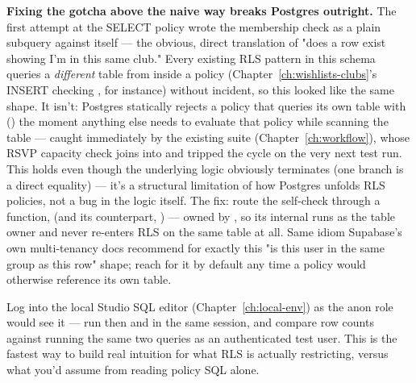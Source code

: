 \begin{olkgotcha}
\textbf{Fixing the gotcha above the naive way breaks Postgres outright.} The first attempt at the  SELECT policy wrote the membership check as a plain  subquery against  itself — the obvious, direct translation of "does a row exist showing I'm in this same club." Every existing RLS pattern in this schema queries a \emph{different} table from inside a policy (Chapter~\ref{ch:wishlists-clubs}'s  INSERT checking , for instance) without incident, so this looked like the same shape. It isn't: Postgres statically rejects a policy that queries its own table with  () the moment anything else needs to evaluate that policy while scanning the table — caught immediately by the existing  suite (Chapter~\ref{ch:workflow}), whose RSVP capacity check joins into  and tripped the cycle on the very next test run. This holds even though the underlying logic obviously terminates (one branch is a direct  equality) — it's a structural limitation of how Postgres unfolds RLS policies, not a bug in the logic itself. The fix: route the self-check through a  function,  (and its  counterpart, ) — owned by , so its internal  runs as the table owner and never re-enters RLS on the same table at all. Same idiom Supabase's own multi-tenancy docs recommend for exactly this "is this user in the same group as this row" shape; reach for it by default any time a policy would otherwise reference its own table.
\end{olkgotcha}

\begin{olktask}
Log into the local Studio SQL editor (Chapter~\ref{ch:local-env}) as the anon role would see it — run  then  and  in the same session, and compare row counts against running the same two queries as an authenticated test user. This is the fastest way to build real intuition for what RLS is actually restricting, versus what you'd assume from reading policy SQL alone.
\end{olktask}
